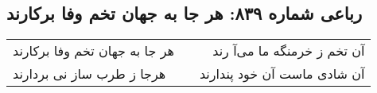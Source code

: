 \begin{center}
\section*{رباعی شماره ۸۳۹: هر جا به جهان تخم وفا برکارند}
\label{sec:0839}
\begin{longtable}{l p{0.5cm} r}
هر جا به جهان تخم وفا برکارند
&&
آن تخم ز خرمنگه ما می‌آ رند
\\
هرجا ز طرب ساز نی بردارند
&&
آن شادی ماست آن خود پندارند
\\
\end{longtable}
\end{center}
